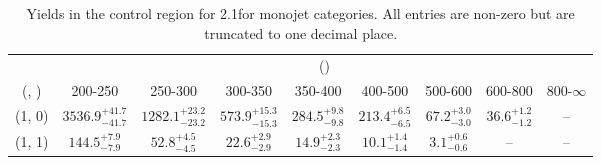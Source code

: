 \begin{table}[h!]
\tiny
\centering
\caption{Yields in the \mj control region for 2.1\ifb for monojet categories. All entries are non-zero but are truncated to one decimal place.\label{tab:yieldssep_mu_ewk_mono}}
\begin{tabular}
{ccccccccc}
	\hline\hline
	& \multicolumn{8}{c}{\scalht (\gev)} \\ 
	 (\njet,  \nb) & 200-250 & 250-300 & 300-350 & 350-400 & 400-500 & 500-600 & 600-800 & 800-$\infty$ \\ [0.8ex] 
\hline
	(1, 0) & $3536.9^{+ 41.7 }_{- 41.7 }$ & $1282.1^{+ 23.2 }_{- 23.2 }$ & $573.9^{+ 15.3 }_{- 15.3 }$ & $284.5^{+ 9.8 }_{- 9.8 }$ & $213.4^{+ 6.5 }_{- 6.5 }$ & $67.2^{+ 3.0 }_{- 3.0 }$ & $36.6^{+ 1.2 }_{- 1.2 }$ & -- \\[0.5ex] 
	(1, 1) & $144.5^{+ 7.9 }_{- 7.9 }$ & $52.8^{+ 4.5 }_{- 4.5 }$ & $22.6^{+ 2.9 }_{- 2.9 }$ & $14.9^{+ 2.3 }_{- 2.3 }$ & $10.1^{+ 1.4 }_{- 1.4 }$ & $3.1^{+ 0.6 }_{- 0.6 }$ & -- & -- \\[0.5ex] 
	\hline
	\hline
\end{tabular}
\end{table}
